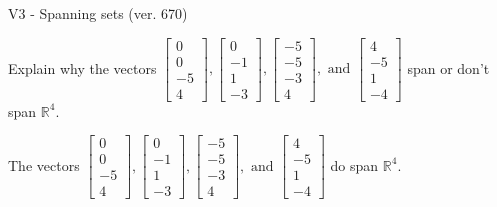 \begin{exercise}
  \begin{exerciseTitle}V3 - Spanning sets (ver. 670)\end{exerciseTitle}
  \begin{exerciseStatement}
    Explain why the vectors \(\left[\begin{array}{r}
0 \\
0 \\
-5 \\
4
\end{array}\right] , \left[\begin{array}{r}
0 \\
-1 \\
1 \\
-3
\end{array}\right] , \left[\begin{array}{r}
-5 \\
-5 \\
-3 \\
4
\end{array}\right] , \text{ and } \left[\begin{array}{r}
4 \\
-5 \\
1 \\
-4
\end{array}\right]\) span or don't span \(\mathbb{R}^4\). 
	


  \end{exerciseStatement}
  \begin{exerciseAnswer}
   The vectors \(\left[\begin{array}{r}
0 \\
0 \\
-5 \\
4
\end{array}\right] , \left[\begin{array}{r}
0 \\
-1 \\
1 \\
-3
\end{array}\right] , \left[\begin{array}{r}
-5 \\
-5 \\
-3 \\
4
\end{array}\right] , \text{ and } \left[\begin{array}{r}
4 \\
-5 \\
1 \\
-4
\end{array}\right]\) 
  	 do  
	span \(\mathbb{R}^4\).
  


  \end{exerciseAnswer}
\end{exercise}